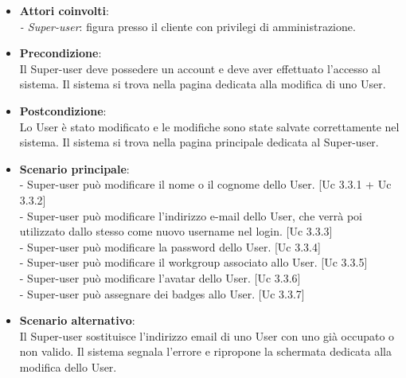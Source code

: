 \documentclass[10pt,a4paper]{article}
\begin{document}
\begin{itemize}
\item \textbf{Attori coinvolti}:\\
\emph{- Super-user}: figura presso il cliente con privilegi di amministrazione.

\item \textbf{Precondizione}:\\
Il Super-user deve possedere un account e deve aver effettuato l'accesso al sistema. Il sistema si trova nella pagina dedicata alla modifica di uno User.

\item \textbf{Postcondizione}:\\
Lo User è stato modificato e le modifiche sono state salvate correttamente nel sistema. Il sistema si trova nella pagina principale dedicata al Super-user.

\item \textbf{Scenario principale}:\\
- Super-user può modificare il nome o il cognome dello User. [Uc 3.3.1 + Uc 3.3.2]\\
- Super-user può modificare l'indirizzo e-mail dello User, che verrà poi utilizzato dallo stesso come nuovo username nel login. [Uc 3.3.3]\\
- Super-user può modificare la password dello User. [Uc 3.3.4]\\
- Super-user può modificare il workgroup associato allo User. [Uc 3.3.5]\\
- Super-user può modificare l'avatar dello User. [Uc 3.3.6]\\
- Super-user può assegnare dei badges allo User. [Uc 3.3.7]

\item \textbf{Scenario alternativo}:\\
Il Super-user sostituisce l'indirizzo email di uno User con uno già occupato o non valido. Il sistema segnala l'errore e ripropone la schermata dedicata alla modifica dello User.

\end{itemize}

\newpage
\end{document}

